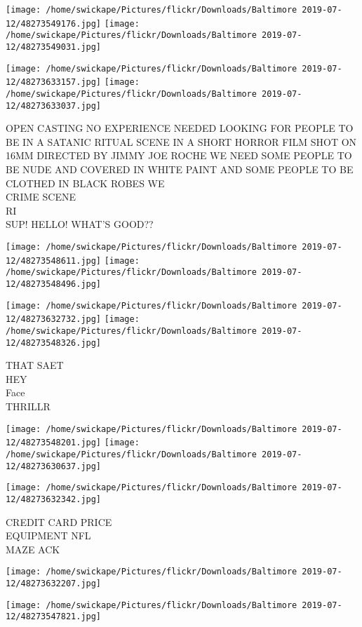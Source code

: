 \documentclass[10pt,letterpaper]{article}
\begin{document}
\texttt{[image: /home/swickape/Pictures/flickr/Downloads/Baltimore 2019-07-12/48273549176.jpg]}
\texttt{[image: /home/swickape/Pictures/flickr/Downloads/Baltimore 2019-07-12/48273549031.jpg]}

\texttt{[image: /home/swickape/Pictures/flickr/Downloads/Baltimore 2019-07-12/48273633157.jpg]}
\texttt{[image: /home/swickape/Pictures/flickr/Downloads/Baltimore 2019-07-12/48273633037.jpg]}

OPEN CASTING NO EXPERIENCE NEEDED LOOKING FOR PEOPLE TO BE IN A SATANIC RITUAL SCENE IN A SHORT HORROR FILM SHOT ON 16MM DIRECTED BY JIMMY JOE ROCHE WE NEED SOME PEOPLE TO BE NUDE AND COVERED IN WHITE PAINT AND SOME PEOPLE TO BE CLOTHED IN BLACK ROBES WE\\
CRIME SCENE\\
RI\\
SUP! HELLO!  WHAT'S GOOD??
\pagebreak

\texttt{[image: /home/swickape/Pictures/flickr/Downloads/Baltimore 2019-07-12/48273548611.jpg]}
\texttt{[image: /home/swickape/Pictures/flickr/Downloads/Baltimore 2019-07-12/48273548496.jpg]}

\texttt{[image: /home/swickape/Pictures/flickr/Downloads/Baltimore 2019-07-12/48273632732.jpg]}
\texttt{[image: /home/swickape/Pictures/flickr/Downloads/Baltimore 2019-07-12/48273548326.jpg]}

THAT SAET\\
HEY\\
Face\\
THRILLR
\pagebreak

\texttt{[image: /home/swickape/Pictures/flickr/Downloads/Baltimore 2019-07-12/48273548201.jpg]}
\texttt{[image: /home/swickape/Pictures/flickr/Downloads/Baltimore 2019-07-12/48273630637.jpg]}

\texttt{[image: /home/swickape/Pictures/flickr/Downloads/Baltimore 2019-07-12/48273632342.jpg]}

CREDIT CARD PRICE\\
EQUIPMENT NFL\\
MAZE ACK
\pagebreak

\texttt{[image: /home/swickape/Pictures/flickr/Downloads/Baltimore 2019-07-12/48273632207.jpg]}

\vspace{0.25in}
\texttt{[image: /home/swickape/Pictures/flickr/Downloads/Baltimore 2019-07-12/48273547821.jpg]}
\end{document}
